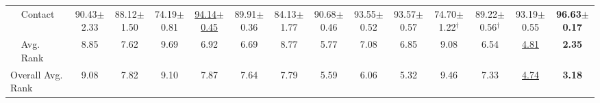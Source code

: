 \begin{table}[t]
{\begin{tabular}{llccccccccccccc}
 & Contact & 90.43{\scriptsize$\pm$2.33} & 88.12{\scriptsize$\pm$1.50} & 74.19{\scriptsize$\pm$0.81} & \underline{94.14{\scriptsize$\pm$0.45}} & 89.91{\scriptsize$\pm$0.36} & 84.13{\scriptsize$\pm$1.77} & 90.68{\scriptsize$\pm$0.46} & 93.55{\scriptsize$\pm$0.52} & 93.57{\scriptsize$\pm$0.57} & 74.70{\scriptsize$\pm$1.22}$^\dagger$ & 89.22{\scriptsize$\pm$0.56}$^\dagger$ & 93.19{\scriptsize$\pm$0.55} & \textbf{96.63{\scriptsize$\pm$0.17}} \\
\cmidrule{2-15}
 & Avg. Rank & 8.85 & 7.62 & 9.69 & 6.92 & 6.69 & 8.77 & 5.77 & 7.08 & 6.85 & 9.08 & 6.54 & \underline{4.81} & \textbf{2.35} \\
\midrule
\multicolumn{2}{l}{Overall Avg. Rank} & 9.08 & 7.82 & 9.10 & 7.87 & 7.64 & 7.79 & 5.59 & 6.06 & 5.32 & 9.46 & 7.33 & \underline{4.74} & \textbf{3.18} \\
\bottomrule
\end{tabular}}
\end{table}
